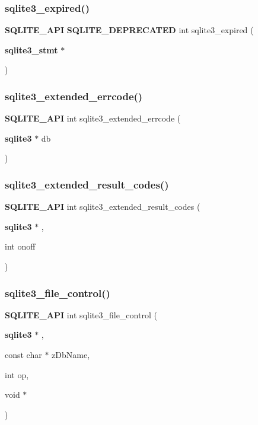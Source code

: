 \subsubsection{sqlite3\_expired()}
{\footnotesize\ttfamily \textbf{ S\+Q\+L\+I\+T\+E\+\_\+\+A\+PI} \textbf{ S\+Q\+L\+I\+T\+E\+\_\+\+D\+E\+P\+R\+E\+C\+A\+T\+ED} int sqlite3\+\_\+expired (\begin{DoxyParamCaption}\item[{\textbf{ sqlite3\+\_\+stmt} $\ast$}]{ }\end{DoxyParamCaption})}

\mbox{\label{sqlite3_8h_a75877f1e69afa101bff864f800dcbb01}} 
\subsubsection{sqlite3\_extended\_errcode()}
{\footnotesize\ttfamily \textbf{ S\+Q\+L\+I\+T\+E\+\_\+\+A\+PI} int sqlite3\+\_\+extended\+\_\+errcode (\begin{DoxyParamCaption}\item[{\textbf{ sqlite3} $\ast$}]{db }\end{DoxyParamCaption})}

\mbox{\label{sqlite3_8h_a0466b6622a1629b54cd15d8aafd82355}} 
\subsubsection{sqlite3\_extended\_result\_codes()}
{\footnotesize\ttfamily \textbf{ S\+Q\+L\+I\+T\+E\+\_\+\+A\+PI} int sqlite3\+\_\+extended\+\_\+result\+\_\+codes (\begin{DoxyParamCaption}\item[{\textbf{ sqlite3} $\ast$}]{,  }\item[{int}]{onoff }\end{DoxyParamCaption})}

\mbox{\label{sqlite3_8h_a33ffb71cb1ea1f7c5f0564166c7d6c08}} 
\subsubsection{sqlite3\_file\_control()}
{\footnotesize\ttfamily \textbf{ S\+Q\+L\+I\+T\+E\+\_\+\+A\+PI} int sqlite3\+\_\+file\+\_\+control (\begin{DoxyParamCaption}\item[{\textbf{ sqlite3} $\ast$}]{,  }\item[{const char $\ast$}]{z\+Db\+Name,  }\item[{int}]{op,  }\item[{void $\ast$}]{ }\end{DoxyParamCaption})}

